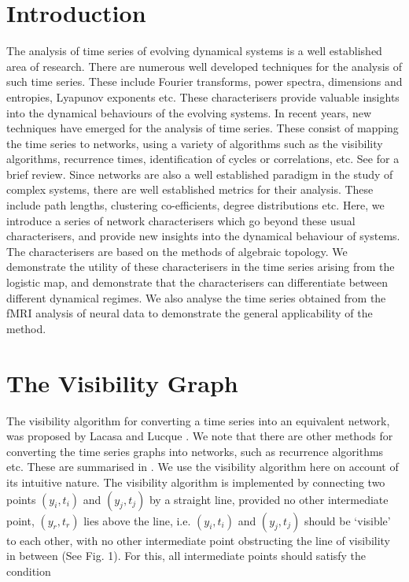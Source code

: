 \documentclass[aps,pre,superscriptaddress,groupedaddress,preprint]{revtex4}  %
\begin{document}
\section{Introduction}
\label{sec:1}

The analysis of time series of evolving dynamical systems is a well established area of research. There are numerous well developed techniques for the analysis 
of such time series. These include Fourier transforms, power spectra, dimensions and entropies, Lyapunov exponents etc. These characterisers provide valuable insights into the dynamical behaviours of the evolving systems. In recent years, new techniques have emerged for the analysis of time series. These consist of mapping the time series to networks, using a variety of algorithms such as the visibility algorithms, recurrence times, identification of cycles or correlations, etc. See  \cite{TSnetreview} for a brief review.  
Since networks are also a well established paradigm in the study of complex systems, there are well established metrics for their analysis. These include path lengths, clustering co-efficients, degree distributions etc. Here, we introduce a series of network characterisers which go beyond these usual characterisers, and provide new insights into the dynamical behaviour of systems. The characterisers are based on the methods of algebraic topology. We demonstrate the utility of these characterisers in the time series arising from the logistic map, and demonstrate that the characterisers can differentiate between different dynamical regimes. We also analyse the time series obtained from the fMRI analysis of neural data to demonstrate the general applicability of the method.

\section{The Visibility Graph}

The visibility algorithm for converting a time series into an equivalent network, was proposed by Lacasa and Lucque \cite{LL}. We note that there are other methods for converting the time series graphs into networks, such as recurrence algorithms etc. These are summarised in \cite{TSnetreview}. We use the visibility algorithm here on account of its intuitive nature. 
The visibility algorithm is implemented by connecting two points $ (y_i, t_i)$
and $(y_j,t_j)$ by a straight line, provided no other intermediate point, $(y_r
, t_r)$ lies above the line, i.e. $(y_i,t_i)$ and $(y_j,t_j)$ should be `visible' to each other, with no other intermediate point obstructing the line of visibility in between (See Fig. 1). For this, all intermediate points should satisfy the condition
\end{document}
